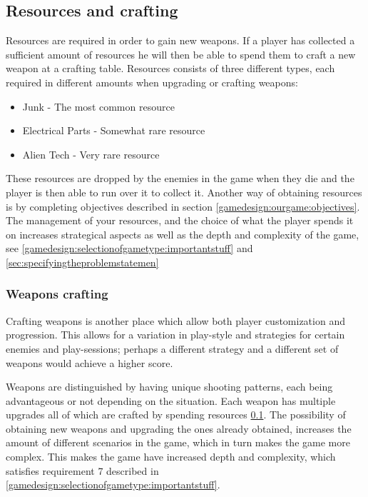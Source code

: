 \subsection{Resources and crafting}\label{gamedesign:ourgame:crafting}
Resources are required in order to gain new weapons.
If a player has collected a sufficient amount of resources he will then be able to spend them to craft a new weapon at a crafting table.
Resources consists of three different types, each required in different amounts when upgrading or crafting weapons:
\begin{itemize}
\item Junk - The most common resource
\item Electrical Parts - Somewhat rare resource
\item Alien Tech - Very rare resource
\end{itemize}
These resources are dropped by the enemies in the game when they die and the player is then able to run over it to collect it. Another way of obtaining resources is by completing objectives described in section \ref{gamedesign:ourgame:objectives}. 
The management of your resources, and the choice of what the player spends it on increases strategical aspects as well as the depth and complexity of the game, see \ref{gamedesign:selectionofgametype:importantstuff} and \ref{sec:specifyingtheproblemstatemen}

\subsubsection*{Weapons crafting}\label{gamedesign:ourgame:weapons}
Crafting weapons is another place which allow both player customization and progression. 
This allows for a variation in play-style and strategies for certain enemies and play-sessions; perhaps a different strategy and a different set of weapons would achieve a higher score.

Weapons are distinguished by having unique shooting patterns, each being advantageous or not depending on the situation.
Each weapon has multiple upgrades all of which are crafted by spending resources \ref{gamedesign:ourgame:crafting}. 
The possibility of obtaining new weapons and upgrading the ones already obtained, increases the amount of different scenarios in the game, which in turn makes the game more complex. 
This makes the game have increased depth and complexity, which satisfies requirement 7 described in \ref{gamedesign:selectionofgametype:importantstuff}.

